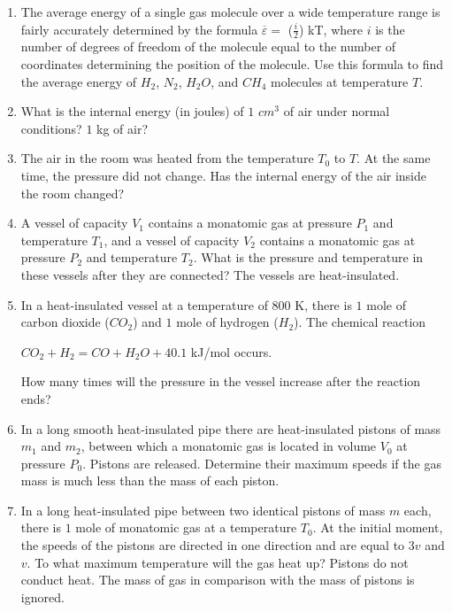 \documentclass{article}
\begin{document}
\begin{enumerate}[label=5.6.\arabic*]

\item The average energy of a single gas molecule over a wide temperature range is fairly accurately determined by the formula $\overline{\varepsilon} = $ ($\frac{i}{2}$) kT, where $i$ is the number of degrees of freedom of the molecule equal to the number of coordinates determining the position of the molecule. Use this formula to find the average energy of $H_2$, $N_2$, $H_2O$, and $CH_4$ molecules at temperature $T$.

\item What is the internal energy (in joules) of $1$ $cm^3$ of air under normal conditions? $1$ kg of air?

\item The air in the room was heated from the temperature $T_0$ to $T$. At the same time, the pressure did not change. Has the internal energy of the air inside the room changed?

\item A vessel of capacity $V_1$ contains a monatomic gas at pressure $P_1$ and temperature $T_1$, and a vessel of capacity $V_2$ contains a monatomic gas at pressure $P_2$ and temperature $T_2$. What is the pressure and temperature in these vessels after they are connected? The vessels are heat-insulated.

\item In a heat-insulated vessel at a temperature of $800$ K, there is $1$ mole of carbon dioxide ($CO_2$) and $1$ mole of hydrogen ($H_2$). The chemical reaction

$CO_2 + H_2 = CO + H_2O + 40.1$ kJ/mol occurs.

How many times will the pressure in the vessel increase after the reaction ends?

\item In a long smooth heat-insulated pipe there are heat-insulated pistons of mass $m_1$ and $m_2$, between which a monatomic gas is located in volume $V_0$ at pressure $P_0$. Pistons are released. Determine their maximum speeds if the gas mass is much less than the mass of each piston.

\item In a long heat-insulated pipe between two identical pistons of mass $m$ each, there is $1$ mole of monatomic gas at a temperature $T_0$. At the initial moment, the speeds of the pistons are directed in one direction and are equal to $3v$ and $v$. To what maximum temperature will the gas heat up? Pistons do not conduct heat. The mass of gas in comparison with the mass of pistons is ignored.


\end{enumerate}
\end{document}

